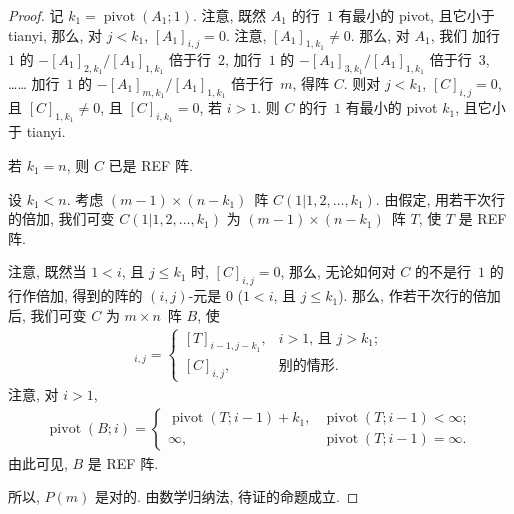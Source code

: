 \documentclass[../libro.tex]{subfiles}
\begin{document}
\begin{proof}
    记 \(k_1 = \operatorname{pivot} {(A_1; 1)}\).
    注意, 既然 \(A_1\) 的行~\(1\) 有最小的 pivot,
    且它小于 tianyi,
    那么, 对 \(j < k_1\),
    \([A_1]_{i,j} = 0\).
    注意, \([A_1]_{1,k_1} \neq 0\).
    那么, 对 \(A_1\),
    我们%
    加行~\(1\) 的 \(-[A_1]_{2,k_1}/[A_1]_{1,k_1}\) 倍于行~\(2\),
    加行~\(1\) 的 \(-[A_1]_{3,k_1}/[A_1]_{1,k_1}\) 倍于行~\(3\),
    ……
    加行~\(1\) 的 \(-[A_1]_{m,k_1}/[A_1]_{1,k_1}\) 倍于行~\(m\),
    得阵 \(C\).
    则对 \(j < k_1\), \([C]_{i,j} = 0\),
    且 \([C]_{1,k_1} \neq 0\),
    且 \([C]_{i,k_1} = 0\), 若 \(i > 1\).
    则 \(C\) 的行~\(1\) 有最小的 pivot \(k_1\),
    且它小于 tianyi.

    若 \(k_1 = n\), 则 \(C\) 已是 REF 阵.

    设 \(k_1 < n\).
    考虑 \((m - 1) \times (n - k_1)\)~阵
    \(C(1|{1,2,\dots,k_1})\).
    由假定, 用若干次行的倍加,
    我们可变 \(C(1|{1,2,\dots,k_1})\) 为
    \((m - 1) \times (n - k_1)\)~阵 \(T\),
    使 \(T\) 是 REF 阵.

    注意, 既然当 \(1 < i\), 且 \(j \leq k_1\) 时,
    \([C]_{i,j} = 0\),
    那么, 无论如何对 \(C\) 的不是行~\(1\) 的行作倍加,
    得到的阵的 \((i, j)\)-元是 \(0\)
    (\(1 < i\), 且 \(j \leq k_1\)).
    那么, 作若干次行的倍加后,
    我们可变 \(C\) 为 \(m \times n\)~阵 \(B\), 使
    \begin{align*}
        [B]_{i,j} =
        \begin{cases}
            [T]_{i-1,j-k_1},
            & \text{\(i > 1\), 且 \(j > k_1\)}; \\
            [C]_{i,j},
            & \text{别的情形}.
        \end{cases}
    \end{align*}
    注意, 对 \(i > 1\),
    \begin{align*}
        \operatorname{pivot} {(B; i)} =
        \begin{cases}
            \operatorname{pivot} {(T; i-1)} + k_1,
            & \operatorname{pivot} {(T; i-1)} < \infty;
            \\
            \infty,
            & \operatorname{pivot} {(T; i-1)} = \infty.
        \end{cases}
    \end{align*}
    由此可见, \(B\) 是 REF 阵.

    所以, \(P(m)\) 是对的.
    由数学归纳法, 待证的命题成立.
\end{proof}
\end{document}
